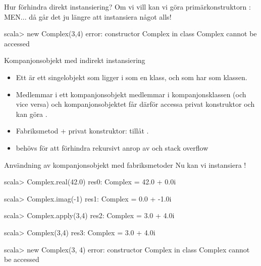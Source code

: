 \begin{Slide}{Hur förhindra direkt instansiering?}
Om vi vill  kan vi göra primärkonstruktorn :
MEN... då går det ju  längre att instansiera något alls!  \code{   :(}
\begin{REPLnonum}
scala> new Complex(3,4)
error:
 constructor Complex in class Complex cannot be accessed
\end{REPLnonum}
\end{Slide}



\begin{Slide}{Kompanjonsobjekt med indirekt instansiering}\SlideFontSmall
\setlength{\leftmargini}{0pt}
\begin{itemize}
\item Ett   är ett singelobjekt som ligger i  som en klass, och som har  som klassen.

\item Medlemmar i ett kompanjonsobjekt  medlemmar i kompanjonsklassen (och vice versa) och kompanjonsobjektet får därför accessa privat konstruktor och kan göra .

\item Fabriksmetod + privat konstruktor: tillåt  .
 

\item {} behövs för att förhindra rekursivt anrop av  och stack overflow
\end{itemize}
\end{Slide}

\begin{Slide}{Användning av kompanjonsobjekt med fabriksmetoder}
Nu kan vi  instansiera !  \code{   :)}
\begin{REPLnonum}
scala> Complex.real(42.0)
res0: Complex = 42.0 + 0.0i

scala> Complex.imag(-1)
res1: Complex = 0.0 + -1.0i

scala> Complex.apply(3,4)
res2: Complex = 3.0 + 4.0i

scala> Complex(3,4)
res3: Complex = 3.0 + 4.0i

scala> new Complex(3, 4)
error:
     constructor Complex in class Complex cannot be accessed
\end{REPLnonum}
\end{Slide}


